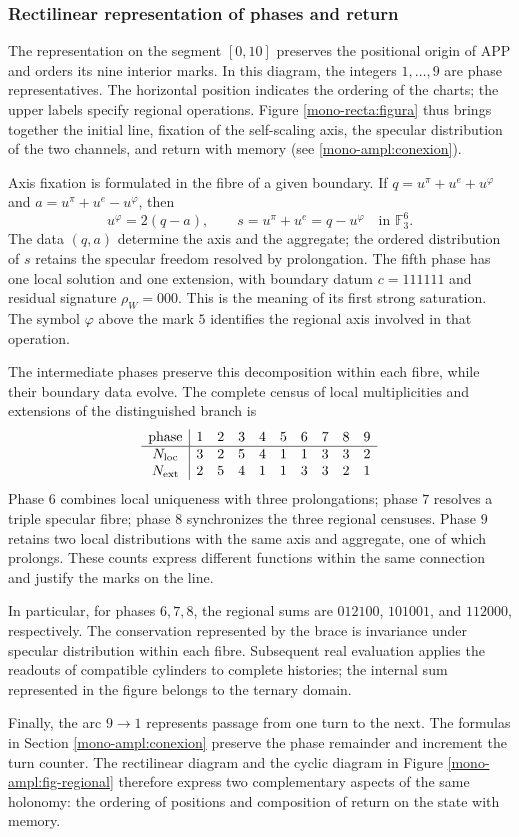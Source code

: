 
\subsubsection{Rectilinear representation of phases and return}
\label{mono-recta:desarrollo}

The representation on the segment \([0,10]\) preserves the positional
origin of APP and orders its nine interior marks. In this diagram,
the integers \(1,\ldots,9\) are phase representatives. The horizontal
position indicates the ordering of the charts; the upper labels
specify regional operations. Figure
\ref{mono-recta:figura} thus brings together the initial line, fixation of the
self-scaling axis, the specular distribution of the two channels, and
return with memory (see \ref{mono-ampl:conexion}).



Axis fixation is formulated in the fibre of a given boundary. If
\(q=u^\pi+u^e+u^\varphi\) and
\(a=u^\pi+u^e-u^\varphi\), then
\[
 u^\varphi=2(q-a),\qquad s=u^\pi+u^e=q-u^\varphi
 \quad\text{in }\mathbb F_3^6.
\]
The data \((q,a)\) determine the axis and the aggregate; the ordered distribution
of \(s\) retains the specular freedom resolved by prolongation.
The fifth phase has one local solution and one extension, with boundary
datum \(c=111111\) and residual signature \(\rho_W=000\). This is the
meaning of its first strong saturation. The symbol \(\varphi\)
above the mark \(5\) identifies the regional axis involved
in that operation.

The intermediate phases preserve this decomposition within each fibre,
while their boundary data evolve. The complete census of
local multiplicities and extensions of the distinguished branch is
\[
\begin{array}{c|rrrrrrrrr}
\text{phase}&1&2&3&4&5&6&7&8&9\\\hline
N_{\rm loc}&3&2&5&4&1&1&3&3&2\\
N_{\rm ext}&2&5&4&1&1&3&3&2&1
\end{array}
\]
Phase \(6\) combines local uniqueness with three prolongations; phase
\(7\) resolves a triple specular fibre; phase \(8\) synchronizes
the three regional censuses. Phase \(9\) retains two local
distributions with the same axis and aggregate, one of which
prolongs. These counts express different functions within the
same connection and justify the marks on the line.

In particular, for phases \(6,7,8\), the regional sums are
\(012100\), \(101001\), and \(112000\), respectively. The conservation
represented by the brace is invariance under specular distribution
within each fibre. Subsequent real evaluation applies the
readouts of compatible cylinders to complete histories; the
internal sum represented in the figure belongs to the ternary domain.

Finally, the arc \(9\to1\) represents passage from one turn to the
next. The formulas in Section
\ref{mono-ampl:conexion} preserve the phase remainder and increment the
turn counter. The rectilinear diagram and the cyclic diagram in
Figure \ref{mono-ampl:fig-regional} therefore express two complementary
aspects of the same holonomy: the ordering of positions and
composition of return on the state with memory.
